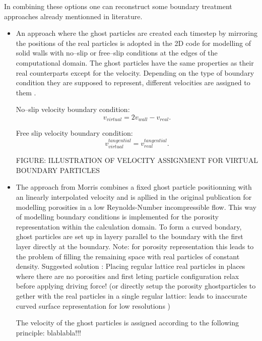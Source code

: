 \documentclass{report}
\begin{document}
In combining these options one can reconstruct some boundary treatment approaches already mentionned in literature.
\begin{itemize}

 \item An approach where the ghost particles are created each timestep by mirroring the positions of the real particles is adopted in the 2D code for modelling of solid walls with no--slip or free--slip conditions at the edges of the computational domain.
The ghost particles have the same properties as their real counterparts
except for the velocity. Depending on the type of boundary condition they are
supposed to represent, different velocities are assigned to them \cite{Hu2006}.

No--slip velocity boundary condition:
\begin{equation}
v_{virtual}=2v_{wall}-v_{real}.
\end{equation}

Free slip velocity boundary condition:
\begin{equation}
v_{virtual}^{tangential}=v_{real}^{tangential}.
\end{equation}

FIGURE: ILLUSTRATION OF VELOCITY ASSIGNMENT FOR VIRTUAL BOUNDARY PARTICLES

\item The approach from Morris \cite{Morris1999} combines a fixed ghost particle positionning with an linearly interpolated velocity and is apllied in the original publication for modelling porosities in a low Reynolds-Number incompressible flow.
This way of modelling boundary conditions is implemented for the porosity representation within the calculation domain. 
To form a curved bondary, ghost particles are set up in layery parallel to the boundary with the first layer directly at the boundary. 
Note: for porosity representation this leads to the problem of filling the remaining space with real particles of constant density. Suggested solution \cite{Morris1997}: Placing regular lattice real particles in places where there are no porosities and first leting particle configuration relax before applying driving force! (or directly setup the porosity ghostparticles to gether with the real particles in a single regular lattice: leads to inaccurate curved surface representation for low resolutions \cite{Monaghan1997})

The velocity of the ghost particles is assigned according to the following principle:
blablabla!!!

\end{itemize}
\end{document}
